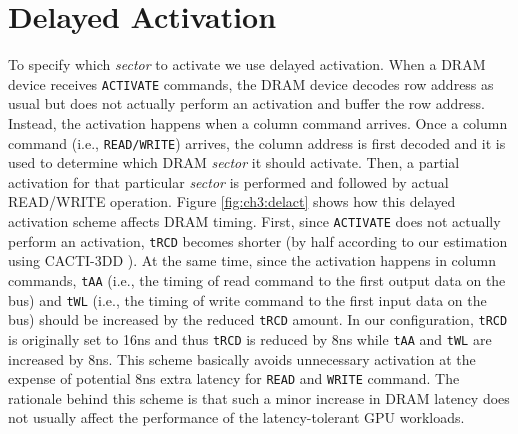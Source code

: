 \section{Delayed Activation}
To specify which {\it sector} to activate we use delayed activation. When a DRAM device receives {\tt ACTIVATE} commands, the DRAM device decodes row address as usual but does not actually perform an activation and buffer the row address. Instead, the activation happens when a column command arrives. Once a column command (i.e., {\tt READ/WRITE}) arrives, the column address is first decoded and it is used to determine which DRAM {\it sector} it should activate. Then, a partial activation for that particular {\it sector} is performed and followed by actual READ/WRITE operation. Figure \ref{fig:ch3:delact} shows how this delayed activation scheme affects DRAM timing. First, since {\tt ACTIVATE} does not actually perform an activation, {\tt tRCD} becomes shorter (by half according to our estimation using CACTI-3DD ). At the same time, since the activation happens in column commands, {\tt tAA} (i.e., the timing of read command to the first output data on the bus) and {\tt tWL} (i.e., the timing of write command to the first input data on the bus) should be increased by the reduced {\tt tRCD} amount. In our configuration, {\tt tRCD} is originally set to 16ns and thus {\tt tRCD} is reduced by 8ns while {\tt tAA} and {\tt tWL} are increased by 8ns. This scheme basically avoids unnecessary activation at the expense of potential 8ns extra latency for {\tt READ} and {\tt WRITE} command. The rationale behind this scheme is that such a minor increase in DRAM latency does not usually affect the performance of the latency-tolerant GPU workloads.

